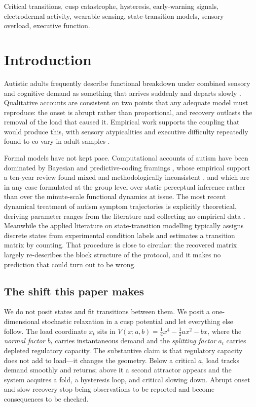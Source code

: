 \documentclass[conference]{IEEEtran}
\begin{document}
\begin{IEEEkeywords}
Critical transitions, cusp catastrophe, hysteresis, early-warning signals,
electrodermal activity, wearable sensing, state-transition models, sensory
overload, executive function.
\end{IEEEkeywords}

\section{Introduction}

Autistic adults frequently describe functional breakdown under combined sensory
and cognitive demand as something that arrives suddenly and departs slowly
\cite{maclennan2022}. Qualitative accounts are consistent on two points that
any adequate model must reproduce: the onset is abrupt rather than
proportional, and recovery outlasts the removal of the load that caused it.
Empirical work supports the coupling that would produce this, with sensory
atypicalities and executive difficulty repeatedly found to co-vary in adult
samples \cite{kiep2025,demetriou2018,demetriou2019}.

Formal models have not kept pace. Computational accounts of autism have been
dominated by Bayesian and predictive-coding framings \cite{pellicano2012},
whose empirical support a ten-year review found mixed and methodologically
inconsistent \cite{chrysaitis2023}, and which are in any case formulated at the
group level over static perceptual inference rather than over the minute-scale
functional dynamics at issue. The most recent dynamical treatment of autism
symptom trajectories is explicitly theoretical, deriving parameter ranges from
the literature and collecting no empirical data \cite{adamou2026}. Meanwhile
the applied literature on state-transition modelling typically assigns discrete
states from experimental condition labels and estimates a transition matrix by
counting. That procedure is close to circular: the recovered matrix largely
re-describes the block structure of the protocol, and it makes no prediction
that could turn out to be wrong.

\subsection*{The shift this paper makes}

We do not posit states and fit transitions between them. We posit a
one-dimensional stochastic relaxation in a cusp potential and let everything
else follow. The load coordinate $x_t$ sits in
$V(x;a,b)=\tfrac14 x^4-\tfrac12 a x^2-bx$, where the \emph{normal factor} $b_t$
carries instantaneous demand and the \emph{splitting factor} $a_t$ carries
depleted regulatory capacity. The substantive claim is that regulatory capacity
does not add to load---it changes the geometry. Below a critical $a$, load
tracks demand smoothly and returns; above it a second attractor appears and the
system acquires a fold, a hysteresis loop, and critical slowing down. Abrupt
onset and slow recovery stop being observations to be reported and become
consequences to be checked.
\end{document}
